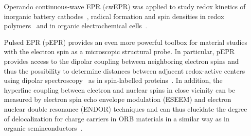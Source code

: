 Operando continuous-wave EPR (cwEPR) was applied to study redox kinetics of inorganic battery cathodes~\cite{Niemoller2019}, radical formation and spin densities in redox polymers~\cite{Dmitrieva2018} and in organic electrochemical cells~\cite{huang2016_jpowersources,Kulikov2022}.

Pulsed EPR (pEPR) provides an even more powerful toolbox for material studies with the electron spin as a microscopic structural probe. In particular, pEPR provides access to the dipolar coupling between neighboring electron spins and thus the possibility to determine distances between adjacent redox-active centers using dipolar spectroscopy~\cite{Salikhov1981} as in spin-labelled proteins~\cite{jeschke2012_annrevphyschem,Toropov1998}. In addition, the hyperfine coupling between electron and nuclear spins in close vicinity can be measured by electron spin echo envelope modulation (ESEEM) and electron nuclear double resonance (ENDOR) techniques and can thus elucidate the degree of delocalization for charge carriers in ORB materials in a similar way as in organic seminconductors~\cite{Behrends2011}.

